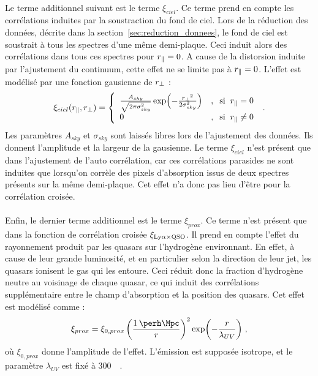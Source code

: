\documentclass[11pt, twoside, a4paper, openright]{report}
\begin{document}
\paragraph{}
Le terme additionnel suivant est le terme $\xi_{ciel}$. Ce terme prend en compte les corrélations induites par la soustraction du fond de ciel. Lors de la réduction des données, décrite dans la section~\ref{sec:reduction_donnees}, le fond de ciel est soustrait à tous les spectres d'une même demi-plaque. Ceci induit alors des corrélations dans tous ces spectres pour $r_{\parallel}{} = 0$. A cause de la distorsion induite par l'ajustement du continuum, cette effet ne se limite pas à $r_{\parallel}{} = 0$.
L'effet est modélisé par une fonction gausienne de $r_{\perp}{}$ :
\begin{equation}
  \xi_{ciel}(r_{\parallel}{}, r_{\perp}{}) =
  \left\{
    \begin{array}{ll}
      \frac{A_{sky}}{\sqrt{2 \pi \sigma_{sky}^{2}}} \exp(- \frac{r_{\perp}{}^2}{2 \sigma_{sky}^2}) & , \hspace{0.2cm} \mathrm{si} \hspace{0.2cm} r_{\parallel}{} = 0 \\
      0 & ,  \hspace{0.2cm} \mathrm{si} \hspace{0.2cm}  r_{\parallel}{} \neq 0
    \end{array}
\right.  \; .
\end{equation}
Les paramètres $A_{sky}$ et $\sigma_{sky}$ sont laissés libres lors de l'ajustement des données. Ils donnent l'amplitude et la largeur de la gausienne.
Le terme $\xi_{ciel}$ n'est présent que dans l'ajustement de l'auto corrélation, car ces corrélations parasides ne sont induites que lorsqu'on corrèle des pixels d'absorption issus de deux spectres présents sur la même demi-plaque. Cet effet n'a donc pas lieu d'être pour la corrélation croisée.

\paragraph{}
Enfin, le dernier terme additionnel est le terme $\xi_{prox}$. Ce terme n'est présent que dans la fonction de corrélation croisée $\xi_{\mathrm{Ly}\alpha\times\textsc{QSO}}$. Il prend en compte l'effet du rayonnement produit par les quasars sur l'hydrogène environnant. En effet, à cause de leur grande luminosité, et en particulier selon la direction de leur jet, les quasars ionisent le gas qui les entoure. Ceci réduit donc la fraction d'hydrogène neutre au voisinage de chaque quasar, ce qui induit des corrélations supplémentaire entre le champ d'absorption \lya{} et la position des quasars. Cet effet est modélisé comme \citep{font-ribera_large-scale_2013} :
\begin{equation}
  \xi_{prox} = \xi_{0,prox} \left(\frac{\SI{1}{\perh\Mpc}}{r} \right)^2 \exp( - \frac{r}{\lambda_{UV}}) \; ,
\end{equation}
où $\xi_{0,prox}$ donne l'amplitude de l'effet. L'émission est supposée isotrope, et le paramètre $\lambda_{UV}$ est fixé à \SI{300}{\perh\Mpc}.
\end{document}
